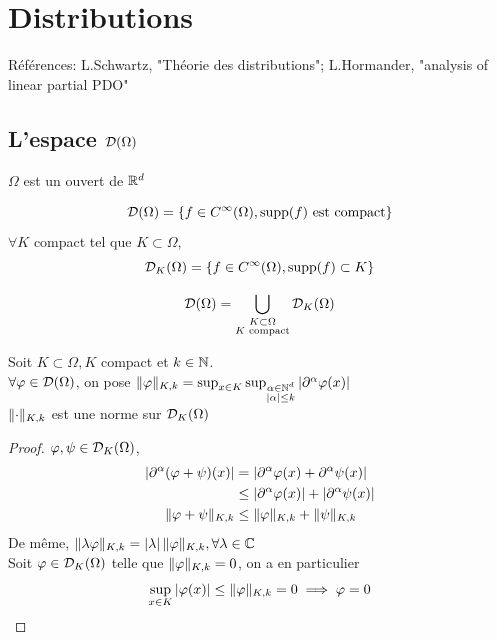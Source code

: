 \documentclass[]{report}
\begin{document}
    \chapter{Distributions}

    Références: L.Schwartz, "Théorie des distributions"; L.Hormander, "analysis of linear partial PDO"

    \section{L'espace $\mathcal{D}(\Omega)$}

    $\Omega$ est un ouvert de $\mathbb{R}^d$

    \begin{df}{}{}
        \[\mathcal{D}(\Omega)=\{f\in C^\infty(\Omega),\text{supp$(f)$ est compact}\}\]
        $\forall K$ compact tel que $K\subset \Omega$,
        \[\mathcal{D}_K(\Omega)=\{f\in C^\infty(\Omega),\text{supp$(f)\subset K$}\}\]    
    \end{df}
    
    \begin{re}{}{}
        \[\mathcal{D}(\Omega)=\bigcup_{\substack{K\subset \Omega \\ K\text{ compact}}}\mathcal{D}_K(\Omega)\]
    \end{re}

    \begin{prop}{}{}
        Soit $K\subset \Omega, K$ compact et $k\in \mathbb{N}$.\\
        $\forall \varphi\in \mathcal{D}(\Omega)$, on pose $\lVert \varphi \rVert_{K,k}=\sup_{x\in K}\sup_{\substack{\alpha\in \mathbb{N}^d\\ |\alpha|\le k}}|\partial^\alpha \varphi(x)|$\\
        $\lVert \cdot \rVert_{K,k}$ est une norme sur $\mathcal{D}_K(\Omega)$
    \end{prop}

    \begin{proof}
        $\varphi,\psi\in \mathcal{D}_K(\Omega)$,
        \begin{align*}
            \left|\partial^\alpha (\varphi+\psi)(x)\right|&= \left|\partial^\alpha\varphi(x)+\partial^\alpha \psi(x)\right|\\
            &\le \left|\partial^\alpha \varphi(x)\right|+\left|\partial^{\alpha} \psi(x)\right|\\
            \lVert \varphi+\psi \rVert_{K,k}&\le\lVert \varphi \rVert_{K,k}+\lVert \psi \rVert_{K,k}
        \end{align*}
        De même, $\lVert \lambda \varphi \rVert_{K,k}=\left|\lambda\right|\lVert \varphi \rVert_{K,k},\forall \lambda\in \mathbb{C}$\\
        Soit $\varphi\in \mathcal{D}_K(\Omega)$ telle que $\lVert \varphi \rVert_{K,k}=0$, on a en particulier
        \[\sup_{x\in K}\left|\varphi(x)\right|\le \lVert \varphi \rVert_{K,k}=0\implies \varphi=0\]
    \end{proof}
\end{document}
